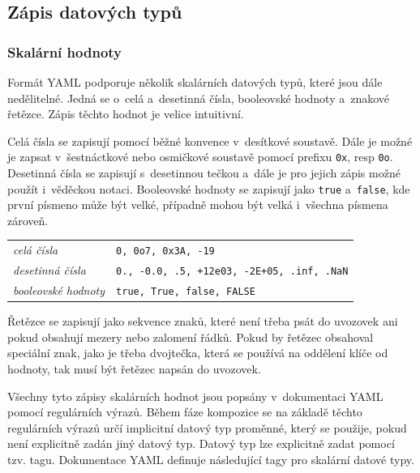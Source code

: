 \documentclass[FM,bw,DP]{tulthesis}
\begin{document}
\subsection{Zápis datových typů}
\label{sec:analyza-yaml-zapis-datovych-typu}

\subsubsection*{Skalární hodnoty}

Formát \gls{YAML} podporuje několik skalárních datových typů, které jsou dále nedělitelné. Jedná se o~celá a~desetinná čísla, booleovské hodnoty a~znakové řetězce. Zápis těchto hodnot je velice intuitivní. 

Celá čísla se zapisují pomocí běžné konvence v~desítkové soustavě. Dále je možné je zapsat v~šestnáctkové nebo osmičkové soustavě pomocí prefixu \texttt{0x}, resp \texttt{0o}. Desetinná čísla se zapisují s~desetinnou tečkou a~dále je pro jejich zápis možné použít i~věděckou notaci. Booleovské hodnoty se zapisují jako \texttt{true} a~\texttt{false}, kde první písmeno může být velké, případně mohou být velká i~všechna písmena zároveň.

\vspace{8pt}
\begin{tabular}{m{5cm}@{}l}
\textit{celá čísla}\dotfill & \texttt{0, 0o7, 0x3A, -19} \\
\textit{desetinná čísla}\dotfill & \texttt{0., -0.0, .5, +12e03, -2E+05, .inf, .NaN}  \\
\textit{booleovské hodnoty}\dotfill & \texttt{true, True, false, FALSE}\\
\end{tabular}
\vspace{8pt}

Řetězce se zapisují jako sekvence znaků, které není třeba psát do uvozovek ani pokud obsahují mezery nebo zalomení řádků. Pokud by řetězec obsahoval speciální znak, jako je třeba dvojtečka, která se používá na oddělení klíče od hodnoty, tak musí být řetězec napsán do uvozovek.

Všechny tyto zápisy skalárních hodnot jsou popsány v~dokumentaci YAML~\cite{bib:yaml} pomocí regulárních výrazů. Během fáze kompozice se na základě těchto regulárních výrazů určí implicitní datový typ proměnné, který se použije, pokud není explicitně zadán jiný datový typ. Datový typ lze explicitně zadat pomocí tzv. tagu. Dokumentace \gls{YAML} definuje následující tagy pro skalární datové typy.
\end{document}
